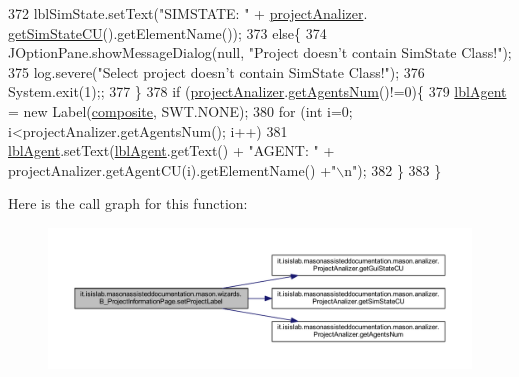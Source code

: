 \begin{DoxyCode}
372             lblSimState.setText(\textcolor{stringliteral}{"SIMSTATE: "} + \hyperlink{classit_1_1isislab_1_1masonassisteddocumentation_1_1mason_1_1wizards_1_1_b___project_information_page_a5129feb0fa34a1d51e44a2fe495ac42c}{projectAnalizer}.
      \hyperlink{classit_1_1isislab_1_1masonassisteddocumentation_1_1mason_1_1analizer_1_1_project_analizer_aab153a7017dc5c1941d353be201491c3}{getSimStateCU}().getElementName());
373         \textcolor{keywordflow}{else}\{
374             JOptionPane.showMessageDialog(null, \textcolor{stringliteral}{"Project doesn't contain SimState Class!"});
375             log.severe(\textcolor{stringliteral}{"Select project doesn't contain SimState Class!"});
376             System.exit(1);;
377         \}           
378         \textcolor{keywordflow}{if} (\hyperlink{classit_1_1isislab_1_1masonassisteddocumentation_1_1mason_1_1wizards_1_1_b___project_information_page_a5129feb0fa34a1d51e44a2fe495ac42c}{projectAnalizer}.\hyperlink{classit_1_1isislab_1_1masonassisteddocumentation_1_1mason_1_1analizer_1_1_project_analizer_aac2a739694623fe15e566ca0330bce3c}{getAgentsNum}()!=0)\{
379             \hyperlink{classit_1_1isislab_1_1masonassisteddocumentation_1_1mason_1_1wizards_1_1_b___project_information_page_af5b4ee969085257cfe8a66867d217b8d}{lblAgent} = \textcolor{keyword}{new} Label(\hyperlink{classit_1_1isislab_1_1masonassisteddocumentation_1_1mason_1_1wizards_1_1_b___project_information_page_abff2b9b46293282381b6cd1b26f83792}{composite}, SWT.NONE);
380             \textcolor{keywordflow}{for} (\textcolor{keywordtype}{int} i=0; i<projectAnalizer.getAgentsNum(); i++)
381                 \hyperlink{classit_1_1isislab_1_1masonassisteddocumentation_1_1mason_1_1wizards_1_1_b___project_information_page_af5b4ee969085257cfe8a66867d217b8d}{lblAgent}.setText(\hyperlink{classit_1_1isislab_1_1masonassisteddocumentation_1_1mason_1_1wizards_1_1_b___project_information_page_af5b4ee969085257cfe8a66867d217b8d}{lblAgent}.getText() + \textcolor{stringliteral}{"AGENT: "} + 
      projectAnalizer.getAgentCU(i).getElementName() +\textcolor{stringliteral}{"\(\backslash\)n"});
382         \}
383     \}
\end{DoxyCode}


Here is the call graph for this function\-:
\nopagebreak
\begin{figure}[H]
\begin{center}
\leavevmode
\includegraphics[width=350pt]{classit_1_1isislab_1_1masonassisteddocumentation_1_1mason_1_1wizards_1_1_b___project_information_page_af5afa21c1d0087572ad8b3d0a1a1fe9c_cgraph}
\end{center}
\end{figure}




